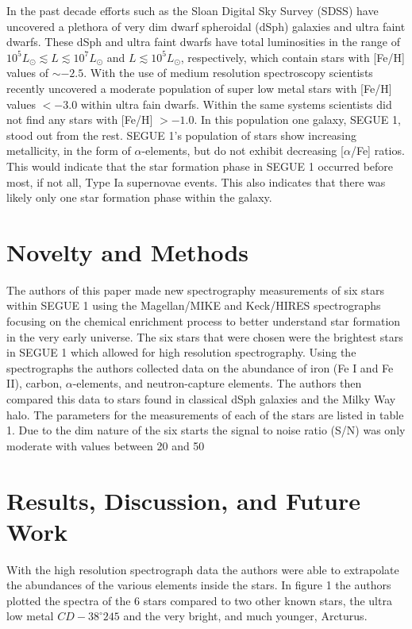 \documentclass{aastex63}
\begin{document}
In the past decade efforts such as the Sloan Digital Sky Survey (SDSS) have uncovered a plethora of very dim dwarf spheroidal
(dSph) galaxies and ultra faint dwarfs. These dSph and ultra faint dwarfs have total luminosities in the range of
\(10^{5} L_{\odot} \lesssim L \lesssim 10^{7} L_{\odot}\) and \(L \lesssim 10^5 L_{\odot}\), respectively, which contain
stars with [Fe/H] values of $\sim -2.5$. With the use of medium resolution spectroscopy scientists recently uncovered a
moderate population of super low metal stars with [Fe/H] values $< -3.0$ within ultra fain dwarfs. Within the same systems
scientists did not find any stars with [Fe/H] $> -1.0$. In this population one galaxy, SEGUE 1, stood out from the rest. 
SEGUE 1's population of stars show increasing metallicity, in the form of $\alpha$-elements, but do not exhibit decreasing
[$\alpha$/Fe] ratios. 
This would indicate that the star formation phase in SEGUE 1 occurred before most, if not all, Type Ia supernovae events. This
also indicates that there was likely only one star formation phase within the galaxy.

\section{Novelty and Methods} \label{sec:novelty}

The authors of this paper made new spectrography measurements of six stars within SEGUE 1 using the Magellan/MIKE and Keck/HIRES
spectrographs focusing on the chemical enrichment process to better understand star formation in the very early universe. The six
stars that were chosen were the brightest stars in SEGUE 1 which allowed for high resolution spectrography. Using the spectrographs
the authors collected data on the abundance of iron (Fe I and Fe II), carbon, $\alpha$-elements, and neutron-capture elements. The authors then compared this data to stars found in classical dSph galaxies and the Milky Way halo.
The parameters for the measurements of each of the stars are listed in table 1. Due to the dim nature of the six starts the signal to
noise ratio (S/N) was only moderate with values between 20 and 50

\section{Results, Discussion, and Future Work} \label{sec:dicussion}

With the high resolution spectrograph data the authors were able to extrapolate the abundances of the various elements inside the stars.
In figure 1 the authors plotted the spectra of the 6 stars compared to two other known stars, the ultra low metal $CD -38^{\circ}245$
and the very bright, and much younger, Arcturus.
\end{document}
